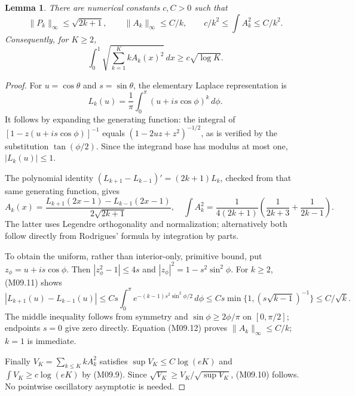 \documentclass[11pt,a4paper]{article}
\newtheorem{lemma}[theorem]{Lemma}
\theoremstyle{definition}\newtheorem{definition}[theorem]{Definition}
\theoremstyle{remark}\newtheorem{remark}[theorem]{Remark}
\numberwithin{equation}{section}
\begin{document}
\begin{lemma}\label{M09-lem:primitive}
There are numerical constants $c,C>0$ such that
\[
 \|P_k\|_\infty\le\sqrt{2k+1},\qquad
 \|A_k\|_\infty\le C/k,\qquad
 c/k^2\le\int A_k^2\le C/k^2.\tag{M09.9}
\]
Consequently, for $K\ge2$,
\[
 \int_0^1\sqrt{\sum_{k=1}^K k A_k(x)^2}\,dx\ge c\sqrt{\log K}.\tag{M09.10}
\]
\end{lemma}
\begin{proof}
For $u=\cos\theta$ and $s=\sin\theta$, the elementary Laplace representation is
\[
 L_k(u)=\frac1\pi\int_0^\pi(u+i s\cos\phi)^k\,d\phi.\tag{M09.11}
\]
It follows by expanding the generating function: the integral of $[1-z(u+i s\cos\phi)]^{-1}$ equals $(1-2uz+z^2)^{-1/2}$, as is verified by the substitution $\tan(\phi/2)$. Since the integrand base has modulus at most one, $|L_k(u)|\le1$.

The polynomial identity $(L_{k+1}-L_{k-1})'=(2k+1)L_k$, checked from that same generating function, gives
\[
 A_k(x)=\frac{L_{k+1}(2x-1)-L_{k-1}(2x-1)}{2\sqrt{2k+1}},
\quad
 \int A_k^2=\frac1{4(2k+1)}\left(\frac1{2k+3}+\frac1{2k-1}\right).\tag{M09.12}
\]
The latter uses Legendre orthogonality and normalization; alternatively both follow directly from Rodrigues' formula by integration by parts.

To obtain the uniform, rather than interior-only, primitive bound, put $z_\phi=u+i s\cos\phi$. Then $|z_\phi^2-1|\le4s$ and $|z_\phi|^2=1-s^2\sin^2\phi$. For $k\ge2$, (M09.11) shows
\[
 |L_{k+1}(u)-L_{k-1}(u)|
 \le Cs\int_0^\pi e^{-(k-1)s^2\sin^2\phi/2}\,d\phi
 \le Cs\min\{1,(s\sqrt{k-1})^{-1}\}\le C/\sqrt k.
\]
The middle inequality follows from symmetry and $\sin\phi\ge2\phi/\pi$ on $[0,\pi/2]$; endpoints $s=0$ give zero directly. Equation (M09.12) proves $\|A_k\|_\infty\le C/k$; $k=1$ is immediate.

Finally $V_K=\sum_{k\le K}kA_k^2$ satisfies $\sup V_K\le C\log(eK)$ and $\int V_K\ge c\log(eK)$ by (M09.9). Since $\sqrt{V_K}\ge V_K/\sqrt{\sup V_K}$, (M09.10) follows. No pointwise oscillatory asymptotic is needed.
\end{proof}
\end{document}
